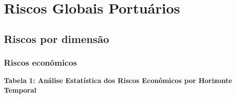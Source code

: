 \documentclass[
  portuguese,
  letterpaper,
  DIV=11,
  numbers=noendperiod]{scrreprt}
\begin{document}

\chapter{Riscos Globais Portuários}\label{riscos-globais-portuuxe1rios}

\section{Riscos por dimensão}\label{riscos-por-dimensuxe3o}

\subsection{Riscos econômicos}\label{riscos-econuxf4micos}

\textbf{Tabela 1: Análise Estatística dos Riscos Econômicos por
Horizonte Temporal}
\end{document}
